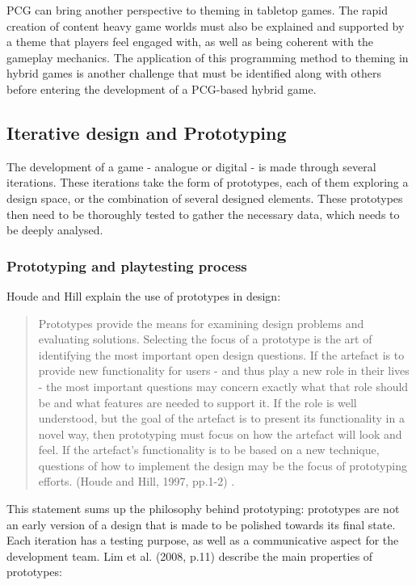 PCG can bring another perspective to theming in tabletop games. The rapid creation of content heavy game worlds must also be explained and supported by a theme that players feel engaged with, as well as being coherent with the gameplay mechanics. The application of this programming method to theming in hybrid games is another challenge that must be identified along with others before entering the development of a PCG-based hybrid game.
\subsection{Iterative design and Prototyping}
\label{sec:proto}
The development of a game - analogue or digital - is made through several iterations. These iterations take the form of prototypes, each of them exploring a design space, or the combination of several designed elements. These prototypes then need to be thoroughly tested to gather the necessary data, which needs to be deeply analysed.
\subsubsection{Prototyping and playtesting process}
Houde and Hill explain the use of prototypes in design:
\begin{quotation}
Prototypes provide the means for examining design problems and evaluating solutions. Selecting the focus of a prototype is the art of identifying the most important open design questions. If the artefact is to provide new functionality for users - and thus play a new role in their lives - the most important questions may concern exactly what that role should be and what features are needed to support it. If the role is well understood, but the goal of the artefact is to present its functionality in a novel way, then prototyping must focus on how the artefact will look and feel. If the artefact's functionality is to be based on a new technique, questions of how to implement the design may be the focus of prototyping efforts. (Houde and Hill, 1997, pp.1-2) \cite{book:proto}.
\end{quotation}
This statement sums up the philosophy behind prototyping: prototypes are not an early version of a design that is made to be polished towards its final state. Each iteration has a testing purpose, as well as a communicative aspect for the development team. Lim et al. (2008, p.11) \cite{book:proto} describe the main properties of prototypes:

